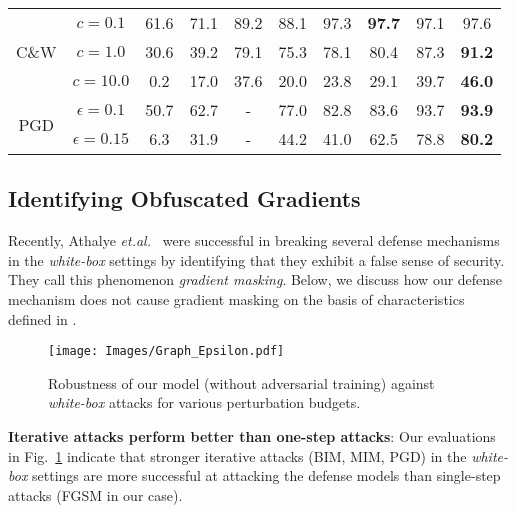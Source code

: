 \documentclass[10pt,twocolumn,letterpaper]{article}
\begin{document}
\begin{table*}[tp]
\begin{center}
{\begin{tabular}{c||c|c|c|c|c|c||c|c|c}
\multirow{3}{*}{C\&W}   &  $c = 0.1 $ & 61.6 & 71.1 & 89.2 &88.1 & 97.3 &\cellcolor{yellow!40} \textbf{97.7}& 97.1 & \cellcolor{blue!10} 97.6\\
 &  $c = 1.0 $ & 30.6 & 39.2 & 79.1 & 75.3 & 78.1& 80.4&\cellcolor{blue!10} 87.3&\cellcolor{yellow!40} \textbf{91.2}\\
 &  $c = 10.0 $ & 0.2 & 17.0 & 37.6 & 20.0 & 23.8 & 29.1 & \cellcolor{blue!10} 39.7&\cellcolor{yellow!40} \textbf{46.0}\\
\hline

\multirow{2}{*}{PGD}   & $\epsilon = 0.1 $ & 50.7 & 62.7 &-& 77.0 & 82.8 & 83.6 &\cellcolor{blue!10} 93.7 &\cellcolor{yellow!40} \textbf{93.9}\\
&  $\epsilon = 0.15 $ & 6.3 & 31.9 &-& 44.2 & 41.0 & 62.5 &\cellcolor{blue!10} 78.8 & \cellcolor{yellow!40} \textbf{80.2}\\
\hline \hline

\end{tabular}}
\vspace{-1.95em}
\end{center}
\end{table*}

\subsection{Identifying Obfuscated Gradients}
Recently, Athalye \textit{et.al.}\ \cite{athalye2018obfuscated} were successful in breaking several defense mechanisms in the \textit{white-box} settings by identifying that they exhibit a false sense of security. They call this phenomenon \textit{gradient masking}. Below, we discuss how our defense mechanism does not cause gradient masking on the basis of characteristics defined in \cite{athalye2018obfuscated, gilmer2018motivating}. 

\begin{figure}
    \centering
{\texttt{[image: Images/Graph\_Epsilon.pdf]} }
   \vspace{-2em}
    \caption{\small{Robustness of our model (without adversarial training) against  \textit{white-box} attacks for various perturbation budgets.}}
    \label{fig:epsilon}\vspace{-0.5em}    
\end{figure}

\noindent
\textbf{Iterative attacks perform better than one-step attacks}: Our evaluations in Fig.~\ref{fig:epsilon} indicate that stronger iterative attacks (\eg BIM, MIM, PGD) in the \textit{white-box} settings are more successful at attacking the defense models than single-step attacks (FGSM in our case). 
\end{document}

